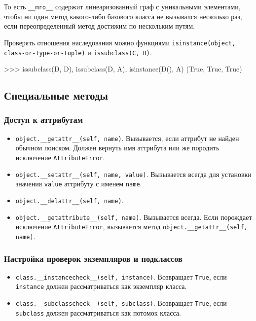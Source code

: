 То есть \lstinline{__mro__} содержит линеаризованный граф с уникальными элементами, чтобы ни один метод какого-либо базового класса не вызывался несколько раз, если переопределенный метод достижим по нескольким путям.

Проверять отношения наследования можно функциями \lstinline{isinstance(object, class-or-type-or-tuple)} и \lstinline{issubclass(C, B)}.
\begin{pylst}{}{}
>>> issubclass(D, D), issubclass(D, A), isinstance(D(), A)
(True, True, True)
\end{pylst}

\subsection{Специальные методы}

\subsubsection{Доступ к аттрибутам}
\begin{itemize}
  \item \lstinline{object.__getattr__(self, name)}. Вызывается, если аттрибут не найден обычном поиском. Должен вернуть имя аттрибута или же породить исключение \lstinline{AttributeError}.
  \item \lstinline{object.__setattr__(self, name, value)}. Вызывается всегда для установки значения \lstinline{value} аттрибуту с именем \lstinline{name}.
  \item \lstinline{object.__delattr__(self, name)}.
  \item \lstinline{object.__getattribute__(self, name)}. Вызывается всегда. Если порождает исключение \lstinline{AttributeError}, вызывается метод \lstinline{object.__getattr__(self, name)}.
\end{itemize}

\subsubsection{Настройка проверок экземпляров и подклассов}
\begin{itemize}
  \item \lstinline{class.__instancecheck__(self, instance)}. Возвращает \lstinline{True}, если \lstinline{instance} должен рассматриваться как экземпляр класса.
  \item \lstinline{class.__subclasscheck__(self, subclass)}. Возвращает \lstinline{True}, если \lstinline{subclass} должен рассматриваться как потомок класса.
\end{itemize}

